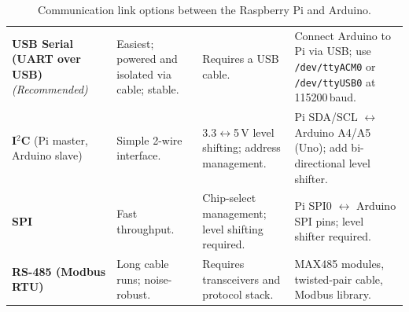  
\begin{table}[p]
  \centering
  \footnotesize
  \renewcommand{\arraystretch}{1.4}
  \setlength{\tabcolsep}{5pt}
  \caption{Communication link options between the Raspberry Pi and Arduino.}
  \label{tab:comms}
  \begin{tabular}{|P{3.2cm}|P{3cm}|P{3cm}|P{6.6cm}|}
    \hline
      & 
      & 
      &  \\
    \hline
    \textbf{USB Serial (UART over USB)}
    \textit{(Recommended)}
      & Easiest; powered and isolated via cable; stable.
      & Requires a USB cable.
      & Connect Arduino to Pi via USB; use
        \texttt{/dev/ttyACM0} or \texttt{/dev/ttyUSB0}
        at 115200\,baud. \\
    \hline
    \textbf{I$^{2}$C} (Pi master, Arduino slave)
      & Simple 2-wire interface.
      & 3.3$\leftrightarrow$5\,V level shifting; address management.
      & Pi SDA/SCL $\leftrightarrow$ Arduino A4/A5 (Uno);
        add bi-directional level shifter. \\
    \hline
    \textbf{SPI}
      & Fast throughput.
      & Chip-select management; level shifting required.
      & Pi SPI0 $\leftrightarrow$ Arduino SPI pins;
        level shifter required. \\
    \hline
    \textbf{RS-485 (Modbus RTU)}
      & Long cable runs; noise-robust.
      & Requires transceivers and protocol stack.
      & MAX485 modules, twisted-pair cable, Modbus library. \\
    \hline
  \end{tabular}
\end{table}